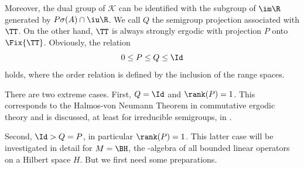 Moreover, the dual group of\/ $\mathcal{K}$ can be identified with the subgroup of\/ $\im\R$ generated by 
$P\sigma(A) \cap \iu  \R $.
We call $Q$ the semigroup projection associated with $\TT$.
On the other hand, $\TT$ is always strongly ergodic with projection $P$ onto $\Fix{\TT}$.
Obviously, the relation
\[
    0 \leq P \leq Q \leq \Id 
\]
holds, where the order relation is defined by the inclusion of the range spaces.

There are two extreme cases.
First, $Q = \Id$ and $ \rank (P) = 1$.
This corresponds to the Halmos-von Neumann Theorem in commutative ergodic theory and is discussed, at least for irreducible semigroups, in \textcite{olesen:1980}.

Second, $\Id > Q = P$, in particular $\rank(P) = 1$.
This latter case will be investigated in detail for $M = \BH $, the \WA-algebra of all bounded linear operators on a Hilbert space $H$.
But we first need some preparations.

